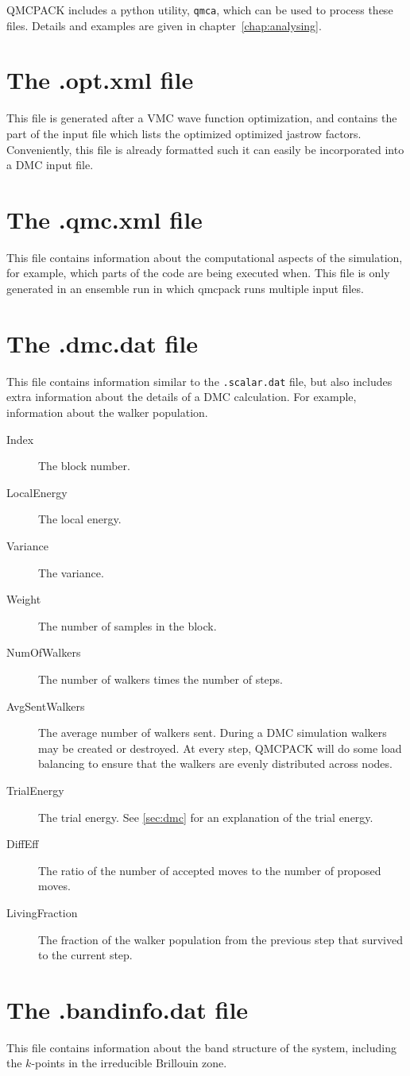 QMCPACK includes a python utility, \texttt{qmca}, which can be used to process these files. Details and examples are given in chapter~\ref{chap:analysing}.
\section{The .opt.xml file}
\label{sec:optxml_file}
This file is generated after a VMC wave function optimization, and contains the part of the input file which lists the optimized optimized jastrow factors.
Conveniently, this file is already formatted such it can easily be incorporated into a DMC input file.

\section{The .qmc.xml file}
\label{sec:qmc_file}
This file contains information about the computational aspects of the simulation, for example, which parts of the code are being executed when. This file is only generated in an ensemble run in which qmcpack runs multiple input files.

\section{The .dmc.dat file}
\label{sec:dmc_file}
This file contains information similar to the \texttt{.scalar.dat} file, but also includes extra information about the details of a DMC calculation. For example, information about the walker population.

\begin{description}
\item[Index] The block number.
\item[LocalEnergy] The local energy.
\item[Variance] The variance.
\item[Weight] The number of samples in the block.
\item[NumOfWalkers] The number of walkers times the number of steps.
\item[AvgSentWalkers] The average number of walkers sent. During a DMC simulation walkers may be created or destroyed. At every step, QMCPACK will do some load balancing to ensure that the walkers are evenly distributed across nodes.
\item[TrialEnergy] The trial energy. See \ref{sec:dmc} for an explanation of the trial energy.
\item[DiffEff] The ratio of the number of accepted moves to the number of proposed moves.
\item[LivingFraction] The fraction of the walker population from the previous step that survived to the current step.
\end{description}


\section{The .bandinfo.dat file}
\label{sec:bandinfo_file}
This file contains information about the band structure of the system, including the $k$-points in the irreducible Brillouin zone.
